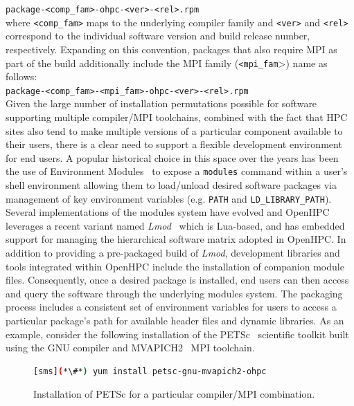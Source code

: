 \documentclass{sig-alternate-05-2015}
\begin{document}
\noindent
\texttt{package-<comp\_fam>-ohpc-<ver>-<rel>.rpm} \\

\noindent where \texttt{<comp\_fam>} maps to the underlying compiler family and \texttt{<ver>}
and \texttt{<rel>} correspond to the individual software version and build
release number, respectively.
Expanding on this convention, packages that also require MPI as part of the build 
additionally include the MPI family (\texttt{<mpi\_fam}>) name as follows: \\

\noindent
\texttt{package-<comp\_fam>-<mpi\_fam>-ohpc-<ver>-<rel>.rpm} \\

\noindent
Given the large number of installation permutations possible for software
supporting multiple compiler/MPI toolchains, combined with the fact that HPC
sites also tend to make multiple versions of a particular component available
to their users, there is a clear need to support a flexible development environment for end
users. A popular historical choice in this space over the years has been the
use of Environment Modules~\cite{furlani_1996} to expose a \texttt{modules}
command within a user's shell environment allowing them to load/unload desired
software packages via management of key environment variables
(e.g. \texttt{{PATH}} and \texttt{{LD\_LIBRARY\_PATH}}). Several
implementations of the modules system have evolved and OpenHPC leverages a
recent variant named {\em Lmod}~\cite{tacc_sc_best_practices:2011,lmod_url}
which is Lua-based, and has embedded support for managing the
hierarchical software matrix adopted in OpenHPC.  In addition to providing a
pre-packaged build of {\em Lmod}, development libraries and tools integrated
within OpenHPC include the installation of companion module files.
Consequently, once a desired package is installed, end users can then access
and query the software through the underlying modules system. The packaging
process includes a consistent set of environment variables for users to
access a particular package's path for available header files and dynamic
libraries. As an example, consider the following installation of the
PETSc~\cite{PETSc_url} scientific toolkit built using the GNU compiler and
MVAPICH2~\cite{mvapich2} MPI toolchain.

\begin{figure}[h]
\begin{lstlisting}[language=bash,keywords={}]
[sms](*\#*) yum install petsc-gnu-mvapich2-ohpc
\end{lstlisting}
\vspace*{-0.3cm}
  \caption{Installation of PETSc for a particular compiler/MPI combination.}
    \label{fig:petscinstall}
\end{figure}
\end{document}
